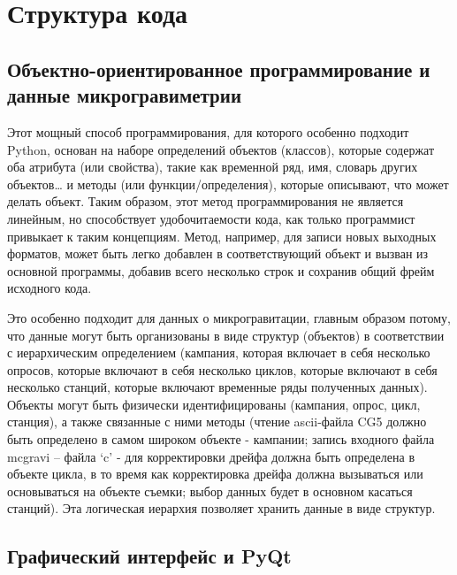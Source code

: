 \chapter[Структура кода]{Структура кода}
\label{chap:code_structure}

\section[Объектно-ориентированное программирование и данные микрогравиметрии]{Объектно-ориентированное программирование и данные микрогравиметрии}
\label{sec:object-oriented programming_and_microgravity_data}

Этот мощный способ программирования, для которого особенно подходит Python,
основан на наборе определений объектов (классов), которые содержат оба атрибута
(или свойства), такие как временной ряд, имя, словарь других объектов… и методы
(или функции/определения), которые описывают, что может делать объект. Таким
образом, этот метод программирования не является линейным, но способствует
удобочитаемости кода, как только программист привыкает к таким концепциям.
Метод, например, для записи новых выходных форматов, может быть легко добавлен в
соответствующий объект и вызван из основной программы, добавив всего несколько
строк и сохранив общий фрейм исходного кода.

Это особенно подходит для данных о микрогравитации, главным образом потому, что
данные могут быть организованы в виде структур (объектов) в соответствии с
иерархическим определением (кампания, которая включает в себя несколько опросов,
которые включают в себя несколько циклов, которые включают в себя несколько
станций, которые включают временные ряды полученных данных). Объекты могут быть
физически идентифицированы (кампания, опрос, цикл, станция), а также связанные с
ними методы (чтение ascii-файла CG5 должно быть определено в самом широком
объекте - кампании; запись входного файла mcgravi – файла ‘c’ - для
корректировки дрейфа должна быть определена в объекте цикла, в то время как
корректировка дрейфа должна вызываться или основываться на объекте съемки; выбор
данных будет в основном касаться станций). Эта логическая иерархия позволяет
хранить данные в виде структур.

\section[Графический интерфейс и PyQt]{Графический интерфейс и PyQt}
\label{sec:gui_and_pyqt}

